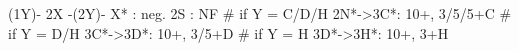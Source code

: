 (1Y)- 2X -(2Y)-
X* : neg.
2S : NF
# if Y = C/D/H
2N*->3C*: 10+, 3/5/5+C
# if Y = D/H
3C*->3D*: 10+, 3/5+D
# if Y = H
3D*->3H*: 10+, 3+H